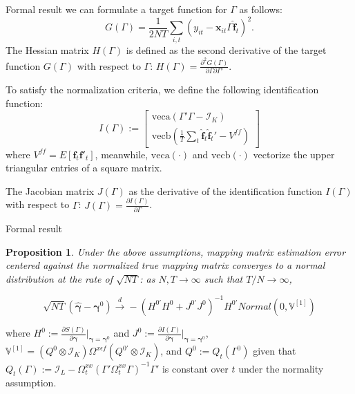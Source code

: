 \documentclass{beamer}
\newtheorem{proposition}{Proposition}
\begin{document}
\begin{frame}{Formal result}
we can formulate a target function for $\Gamma$ as follows:
\begin{equation*}
\label{eqn: target}
G(\Gamma) = \frac{1}{2NT}\sum_{i,t} \left( y_{it} - \boldsymbol{x}_{it}\Gamma \boldsymbol{\hat{f}}_t \right)^2.
\end{equation*}
The Hessian matrix $H(\Gamma)$ is defined as the second derivative of the target function $G(\Gamma)$ with respect to $\Gamma$: $H(\Gamma) = \frac{\partial^2 G(\Gamma)}{\partial \Gamma \partial \Gamma'}$. 

To satisfy the normalization criteria, we define the following identification function:
\begin{equation*}
\label{eqn: identification}
I(\Gamma) := \begin{bmatrix}
    \text{veca}(\Gamma' \Gamma - \mathcal{I}_K) \\
    \text{vecb}\left(\frac{1}{T} \sum_{t} \boldsymbol{\hat{f}}_t\boldsymbol{\hat{f}}_t' - V^{ff}\right)
    \end{bmatrix}
\end{equation*}
where $V^{ff} = E\left[\boldsymbol{f}_t\boldsymbol{f}'_t\right]$, meanwhile, $\text{veca}(\cdot)$ and $\text{vecb}(\cdot)$ vectorize the upper triangular entries of a square matrix.

The Jacobian matrix $J(\Gamma)$ as the derivative of the identification function $I(\Gamma)$ with respect to $\Gamma$: $J(\Gamma) = \frac{\partial I(\Gamma)}{\partial \Gamma}$.
\end{frame}

\begin{frame}{Formal result}
\begin{proposition}
\label{prop: gamma}
Under the above assumptions, mapping matrix estimation error centered against the normalized true mapping matrix converges to a normal distribution at the rate of $\sqrt{NT}$: as $N, T \rightarrow \infty$ such that $T/N \rightarrow \infty$,

$$
\sqrt{NT} \left( \hat{\boldsymbol{\gamma}} - \boldsymbol{\gamma}^0 \right) \xrightarrow{d} - \left( H^{0'}H^0 + J^{0'}J^0 \right)^{-1}H^{0'}Normal(0, \mathbb{V}^{[1]})
$$
\end{proposition}
where $H^0:= \frac{\partial S(\Gamma)}{\partial \boldsymbol{\gamma}}|_{\boldsymbol{\gamma} = \boldsymbol{\gamma}^0}$ and $J^0:= \frac{\partial I(\Gamma)}{\partial \boldsymbol{\gamma}}|_{\boldsymbol{\gamma} = \boldsymbol{\gamma}^0}$, $\mathbb{V}^{[1]} = \left( Q^0 \otimes \mathcal{I}_K \right) \Omega^{x\epsilon f} \left( Q^{0'} \otimes \mathcal{I}_K \right)$, and $Q^0 := Q_t(\Gamma^0)$ given that $Q_t(\Gamma) := \mathcal{I}_L - \Omega_t^{xx} \left( \Gamma' \Omega^{xx}_t \Gamma \right)^{-1}\Gamma'$ is constant over $t$ under the normality assumption.
\end{frame}
\end{document}
